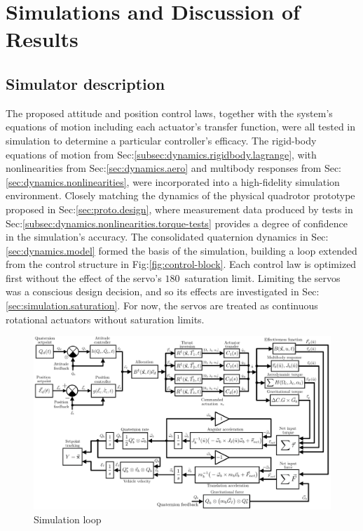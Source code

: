 \chapter{Simulations and  Discussion of Results}
\label{ch:simulation}
\section{Simulator description}
\label{sec:simulation.block}
The proposed attitude and position control laws, together with the system's equations of motion including each actuator's transfer function, were all tested in simulation to determine a particular controller's efficacy. The rigid-body equations of motion from Sec:\ref{subsec:dynamics.rigidbody.lagrange}, with nonlinearities from Sec:\ref{sec:dynamics.aero} and multibody responses from Sec:\ref{sec:dynamics.nonlinearities}, were incorporated into a high-fidelity simulation environment. Closely matching the dynamics of the physical quadrotor prototype proposed in Sec:\ref{sec:proto.design}, where measurement data produced by tests in Sec:\ref{subsec:dynamics.nonlinearities.torque-tests} provides a degree of confidence in the simulation's accuracy. The consolidated quaternion dynamics in Sec:\ref{sec:dynamics.model} formed the basis of the simulation, building a loop extended from the control structure in Fig:\ref{fig:control-block}. Each control law is optimized first without the effect of the servo's $180$\textdegree ~saturation limit. Limiting the servos was a conscious design decision, and so its effects are investigated in Sec:\ref{sec:simulation.saturation}. For now, the servos are treated as continuous rotational actuators without saturation limits.
\par
\begin{figure}[htbp]
\centering
\includegraphics[width=\textwidth]{figs/simulation-block}
\vspace{-10pt}
\caption{Simulation loop}
\label{fig:simulation-block}
\end{figure}
